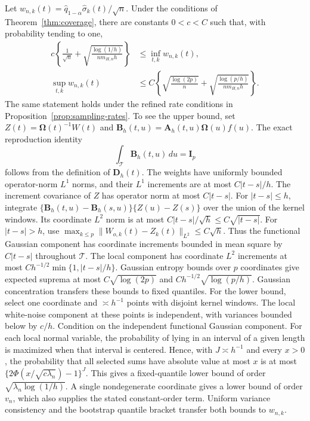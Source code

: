 \documentclass[10pt]{book}
\newcommand{\bA}{{\mathbf A}}
\newcommand{\bB}{{\mathbf B}}
\newcommand{\bD}{{\mathbf D}}
\newcommand{\bI}{{\mathbf I}}
\newcommand{\bOmega} {\boldsymbol{\Omega}}
\newcommand{\wh}{\widehat}
\numberwithin{equation}{section}
\begin{document}
Let $w_{n,k}(t)=\wh q_{1-\alpha}\wh\sigma_k(t)/\sqrt n$.
Under the conditions of Theorem~\ref{thm:coverage}, there are constants
$0<c<C$ such that, with probability tending to one,
\begin{equation*}
\begin{split}
c\left\{\frac1{\sqrt n}+
\sqrt{\frac{\log(1/h)}{nm_{H,n}h}}\right\}
&\le\inf_{t,k}w_{n,k}(t),\\
\sup_{t,k}w_{n,k}(t)
&\le C\left\{\sqrt{\frac{\log(2p)}n}+
\sqrt{\frac{\log(p/h)}{nm_{H,n}h}}\right\}.
\end{split}
\end{equation*}
The same statement holds under the refined rate conditions in
Proposition~\ref{prop:sampling-rates}.
To see the upper bound, set $Z(t)=\bOmega(t)^{-1}W(t)$ and
$\bB_h(t,u)=\bA_h(t,u)\bOmega(u)f(u)$. The exact reproduction identity
\[
\int_{\mathcal T}\bB_h(t,u)\,du=\bI_p
\]
follows from the definition of $\bD_h(t)$. The weights have uniformly
bounded operator-norm $L^1$ norms, and their $L^1$ increments are at
most $C|t-s|/h$. The increment covariance of $Z$ has operator norm at most $C|t-s|$. For $|t-s|\le h$, integrate
$\{\bB_h(t,u)-\bB_h(s,u)\}\{Z(u)-Z(s)\}$ over the union of the
kernel windows. Its coordinate $L^2$ norm is at most
$C|t-s|/\sqrt h\le C\sqrt{|t-s|}$.
For $|t-s|>h$, use
$\max_{k\le p}\|W_{o,k}(t)-Z_k(t)\|_{L^2}\le C\sqrt h$.
Thus the functional Gaussian component has coordinate increments
bounded in mean square by $C|t-s|$ throughout $\mathcal T$.
The local component has coordinate $L^2$ increments at most
$Ch^{-1/2}\min\{1,|t-s|/h\}$.
Gaussian entropy bounds over $p$ coordinates give expected suprema at most
$C\sqrt{\log(2p)}$ and $Ch^{-1/2}\sqrt{\log(p/h)}$.
Gaussian concentration transfers these bounds to fixed quantiles.
For the lower bound, select one coordinate and $\asymp h^{-1}$ points
with disjoint kernel windows. The local white-noise component at these
points is independent, with variances bounded below by $c/h$.
Condition on the independent functional Gaussian component. For each local
normal variable, the probability of lying in an interval of a given length
is maximized when that interval is centered. Hence, with $J\asymp h^{-1}$
and every $x>0$, the probability that all selected sums have absolute value
at most $x$ is at most
$\{2\Phi(x/\sqrt{c\lambda_n})-1\}^{J}$.
This gives a fixed-quantile lower bound of order
$\sqrt{\lambda_n\log(1/h)}$. A single nondegenerate coordinate gives
a lower bound of order $v_n$, which also supplies the stated
constant-order term.
Uniform variance consistency and the bootstrap quantile bracket transfer
both bounds to $w_{n,k}$.
\end{document}
